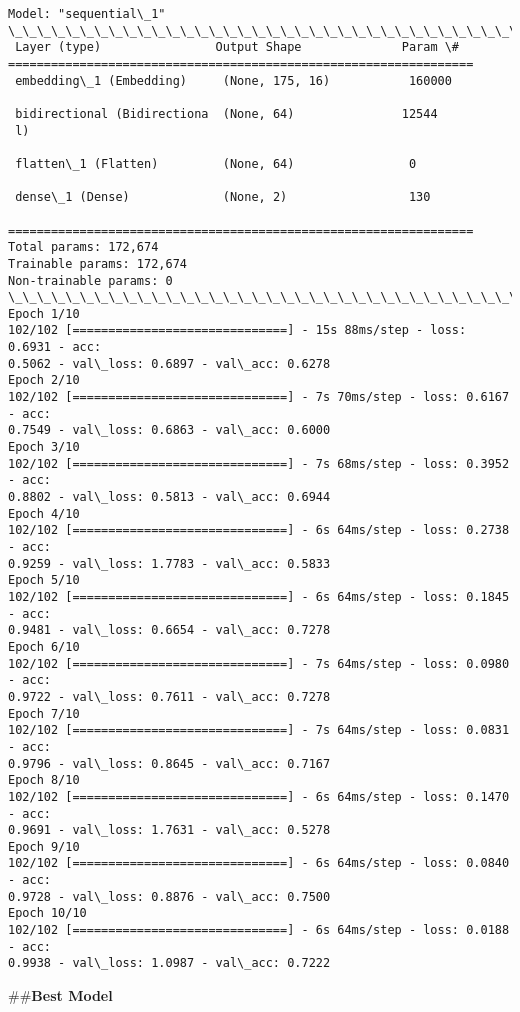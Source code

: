 \documentclass[11pt]{article}
\begin{document}
    \begin{Verbatim}[commandchars=\\\{\}]
Model: "sequential\_1"
\_\_\_\_\_\_\_\_\_\_\_\_\_\_\_\_\_\_\_\_\_\_\_\_\_\_\_\_\_\_\_\_\_\_\_\_\_\_\_\_\_\_\_\_\_\_\_\_\_\_\_\_\_\_\_\_\_\_\_\_\_\_\_\_\_
 Layer (type)                Output Shape              Param \#
=================================================================
 embedding\_1 (Embedding)     (None, 175, 16)           160000

 bidirectional (Bidirectiona  (None, 64)               12544
 l)

 flatten\_1 (Flatten)         (None, 64)                0

 dense\_1 (Dense)             (None, 2)                 130

=================================================================
Total params: 172,674
Trainable params: 172,674
Non-trainable params: 0
\_\_\_\_\_\_\_\_\_\_\_\_\_\_\_\_\_\_\_\_\_\_\_\_\_\_\_\_\_\_\_\_\_\_\_\_\_\_\_\_\_\_\_\_\_\_\_\_\_\_\_\_\_\_\_\_\_\_\_\_\_\_\_\_\_
Epoch 1/10
102/102 [==============================] - 15s 88ms/step - loss: 0.6931 - acc:
0.5062 - val\_loss: 0.6897 - val\_acc: 0.6278
Epoch 2/10
102/102 [==============================] - 7s 70ms/step - loss: 0.6167 - acc:
0.7549 - val\_loss: 0.6863 - val\_acc: 0.6000
Epoch 3/10
102/102 [==============================] - 7s 68ms/step - loss: 0.3952 - acc:
0.8802 - val\_loss: 0.5813 - val\_acc: 0.6944
Epoch 4/10
102/102 [==============================] - 6s 64ms/step - loss: 0.2738 - acc:
0.9259 - val\_loss: 1.7783 - val\_acc: 0.5833
Epoch 5/10
102/102 [==============================] - 6s 64ms/step - loss: 0.1845 - acc:
0.9481 - val\_loss: 0.6654 - val\_acc: 0.7278
Epoch 6/10
102/102 [==============================] - 7s 64ms/step - loss: 0.0980 - acc:
0.9722 - val\_loss: 0.7611 - val\_acc: 0.7278
Epoch 7/10
102/102 [==============================] - 7s 64ms/step - loss: 0.0831 - acc:
0.9796 - val\_loss: 0.8645 - val\_acc: 0.7167
Epoch 8/10
102/102 [==============================] - 6s 64ms/step - loss: 0.1470 - acc:
0.9691 - val\_loss: 1.7631 - val\_acc: 0.5278
Epoch 9/10
102/102 [==============================] - 6s 64ms/step - loss: 0.0840 - acc:
0.9728 - val\_loss: 0.8876 - val\_acc: 0.7500
Epoch 10/10
102/102 [==============================] - 6s 64ms/step - loss: 0.0188 - acc:
0.9938 - val\_loss: 1.0987 - val\_acc: 0.7222
    \end{Verbatim}

    \#\#\textbf{Best Model}
\end{document}
